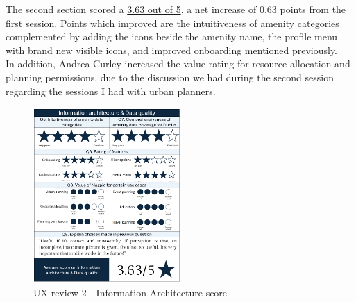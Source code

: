 \noindent The second section scored a \underline{3.63 out of 5}, a net increase of 0.63 points from the first session. Points which improved are the intuitiveness of amenity categories complemented by adding the icons beside the amenity name, the profile menu with brand new visible icons, and improved onboarding mentioned previously.\\
In addition, Andrea Curley increased the value rating for resource allocation and planning permissions, due to the discussion we had during the second session regarding the sessions I had with urban planners.
\begin{figure}[h!]
    \centering
    \includegraphics[width=0.5\textwidth]{images/ux-survey2-data.png}
    \caption{UX review 2 - Information Architecture score}
\end{figure}


